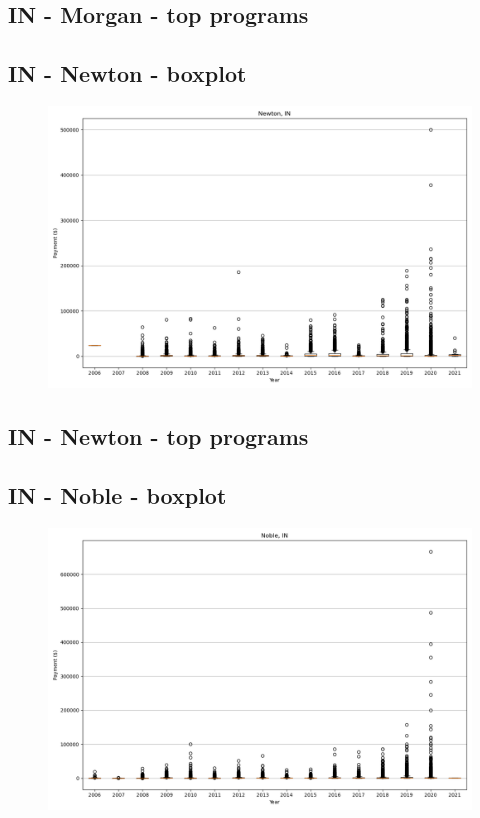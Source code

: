 \subsection*{IN - Morgan - top programs}

\newpage
\subsection*{IN - Newton - boxplot}
\begin{figure}[h]
\centering
\includegraphics[width=7in]{../output/boxplots/counties/Newton-IN_boxplot.png}
\end{figure}


\subsection*{IN - Newton - top programs}

\newpage
\subsection*{IN - Noble - boxplot}
\begin{figure}[h]
\centering
\includegraphics[width=7in]{../output/boxplots/counties/Noble-IN_boxplot.png}
\end{figure}


